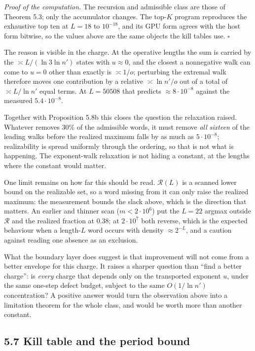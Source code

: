 \documentclass[12pt]{article}
\begin{document}
\emph{Proof of the computation.} The recursion and admissible class are
those of Theorem 5.3; only the accumulator changes. The top-\(K\)
program reproduces the exhaustive top ten at \(L=18\) to \(10^{-18}\),
and its GPU form agrees with the host form bitwise, so the values above
are the same objects the kill tables use. \(\square\)

The reason is visible in the charge. At the operative lengths the sum is
carried by the \(\asymp L/(\ln3\ln n')\) states with \(u\approx0\), and
the closest a nonnegative walk can come to \(u=0\) other than exactly is
\(\asymp1/o\); perturbing the extremal walk therefore moves one
contribution by a relative \(\asymp\ln n'/o\) out of a total of
\(\asymp L/\ln n'\) equal terms. At \(L=50508\) that predicts
\(\approx8\cdot10^{-8}\) against the measured \(5.4\cdot10^{-8}\).

Together with Proposition 5.8b this closes the question the relaxation
raised. Whatever removes \(30\%\) of the admissible words, it must
remove \emph{all sixteen} of the leading walks before the realized
maximum falls by as much as \(5\cdot10^{-8}\); realizability is spread
uniformly through the ordering, so that is not what is happening. The
exponent-walk relaxation is not hiding a constant, at the lengths where
the constant would matter.

One limit remains on how far this should be read. \(\mathcal R(L)\) is a
scanned lower bound on the realizable set, so a word missing from it can
only raise the realized maximum: the measurement bounds the slack above,
which is the direction that matters. An earlier and thinner scan
(\(m<2\cdot10^{6}\)) put the \(L=22\) argmax outside \(\mathcal R\) and
the realized fraction at \(0.38\); at \(2\cdot10^{7}\) both reverse,
which is the expected behaviour when a length-\(L\) word occurs with
density \(\approx2^{-L}\), and a caution against reading one absence as
an exclusion.

What the boundary layer does suggest is that improvement will not come
from a better envelope for this charge. It raises a sharper question
than ``find a better charge'': is \emph{every} charge that depends only
on the transported exponent \(u\), under the same one-step defect
budget, subject to the same \(O(1/\ln n')\) concentration? A positive
answer would turn the observation above into a limitation theorem for
the whole class, and would be worth more than another constant.

\subsection{5.7 Kill table and the period
bound}\label{kill-table-and-the-period-bound}
\end{document}
